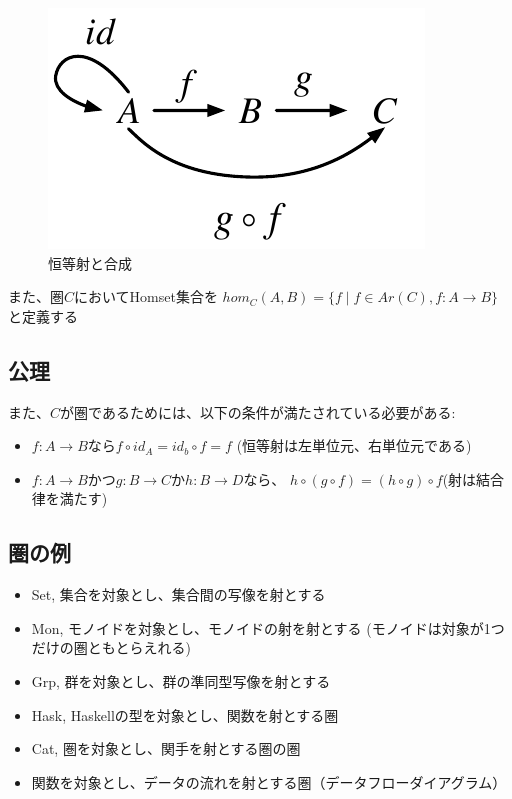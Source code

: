 \documentclass{jsarticle}
\begin{document}
\begin{figure}[htbp]
    \centering
    \includegraphics{diag_comp.pdf}
    \caption{恒等射と合成}
\end{figure}

また、圏$C$においてHomset集合を
$hom_C(A,B)=\{f \mid f \in Ar(C), f: A \to B\}$と定義する

\subsection{公理}
また、$C$が圏であるためには、以下の条件が満たされている必要がある:
\begin{itemize}
    \item $f:A \to B$なら$f \circ id_A = id_b \circ f = f$
        (恒等射は左単位元、右単位元である)
    \item $f:A \to B$かつ$g: B \to C$か$h: B \to D$なら、
        $h \circ (g \circ f)=(h\circ g) \circ f$(射は結合律を満たす)
\end{itemize}

\subsection{圏の例}
\begin{itemize}
    \item Set, 集合を対象とし、集合間の写像を射とする
    \item Mon, モノイドを対象とし、モノイドの射を射とする
        (モノイドは対象が1つだけの圏ともとらえれる)
    \item Grp, 群を対象とし、群の準同型写像を射とする
    \item Hask, Haskellの型を対象とし、関数を射とする圏
    \item Cat, 圏を対象とし、関手を射とする圏の圏
    \item 関数を対象とし、データの流れを射とする圏（データフローダイアグラム）
\end{itemize}
\end{document}
